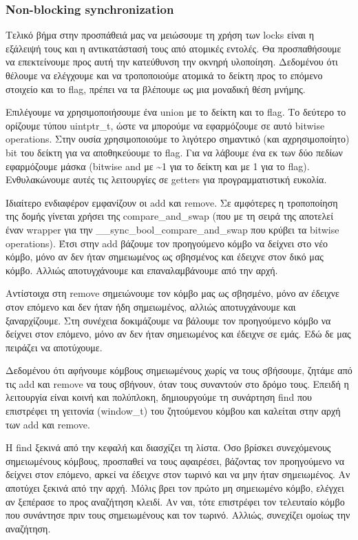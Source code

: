 \documentclass[12pt,titlepage]{article}
\begin{document}
\subsubsection{Non-blocking synchronization}

Τελικό βήμα στην προσπάθειά μας να μειώσουμε τη χρήση των locks είναι η εξάλειψή
τους και η αντικατάστασή τους από ατομικές εντολές. Θα προσπαθήσουμε να
επεκτείνουμε προς αυτή την κατεύθυνση την οκνηρή υλοποίηση. Δεδομένου ότι
θέλουμε να ελέγχουμε και να τροποποιούμε ατομικά το δείκτη προς το επόμενο
στοιχείο και το flag, πρέπει να τα βλέπουμε ως μια μοναδική θέση μνήμης.

Επιλέγουμε να χρησιμοποιήσουμε ένα union με το δείκτη και το flag. Το δεύτερο το
ορίζουμε τύπου uintptr\_t, ώστε να μπορούμε να εφαρμόζουμε σε αυτό bitwise
operations. Στην ουσία χρησιμοποιούμε το λιγότερο σημαντικό (και αχρησιμοποίητο)
bit του δείκτη για να αποθηκεύουμε το flag. Για να λάβουμε ένα εκ των δύο πεδίων
εφαρμόζουμε μάσκα (bitwise and με \textasciitilde1 για το δείκτη και με 1 για το
flag). Ενθυλακώνουμε αυτές τις λειτουργίες σε getters για προγραμματιστική
ευκολία.

Ιδιαίτερο ενδιαφέρον εμφανίζουν οι add και remove. Σε αμφότερες η τροποποίηση
της δομής γίνεται χρήσει της compare\_and\_swap (που με τη σειρά της αποτελεί
έναν wrapper για την \_\_sync\_bool\_compare\_and\_swap που κρύβει τα bitwise
operations). Έτσι στην add βάζουμε τον προηγούμενο κόμβο να δείχνει στο νέο
κόμβο, μόνο αν δεν ήταν σημειωμένος ως σβησμένος και έδειχνε στον δικό μας
κόμβο. Αλλιώς αποτυγχάνουμε και επαναλαμβάνουμε από την αρχή.

Αντίστοιχα στη remove σημειώνουμε τον κόμβο μας ως σβησμένο, μόνο αν έδειχνε
στον επόμενο και δεν ήταν ήδη σημειωμένος, αλλιώς αποτυγχάνουμε και
ξαναρχίζουμε. Στη συνέχεια δοκιμάζουμε να βάλουμε τον προηγούμενο κόμβο να
δείχνει στον επόμενο, μόνο αν δεν ήταν σημειωμένος και έδειχνε σε εμάς. Εδώ δε
μας πειράζει να αποτύχουμε.

Δεδομένου ότι αφήνουμε κόμβους σημειωμένους χωρίς να τους σβήσουμε, ζητάμε από
τις add και remove να τους σβήνουν, όταν τους συναντούν στο δρόμο τους.
Επειδή η λειτουργία είναι κοινή και πολύπλοκη, δημιουργούμε τη συνάρτηση find
που επιστρέφει τη γειτονία (window\_t) του ζητούμενου κόμβου και καλείται στην
αρχή των add και remove.

Η find ξεκινά από την κεφαλή και διασχίζει τη λίστα. Όσο βρίσκει συνεχόμενους
σημειωμένους κόμβους, προσπαθεί να τους αφαιρέσει, βάζοντας τον προηγούμενο να
δείχνει στον επόμενο, αρκεί να έδειχνε στον τωρινό και να μην ήταν σημειωμένος.
Αν αποτύχει ξεκινά από την αρχή. Μόλις βρει τον πρώτο μη σημειωμένο κόμβο,
ελέγχει αν ξεπέρασε το προς αναζήτηση κλειδί. Αν ναι, τότε επιστρέφει τον
τελευταίο κόμβο που συνάντησε πριν τους σημειωμένους και τον τωρινό. Αλλιώς,
συνεχίζει ομοίως την αναζήτηση.
\end{document}
